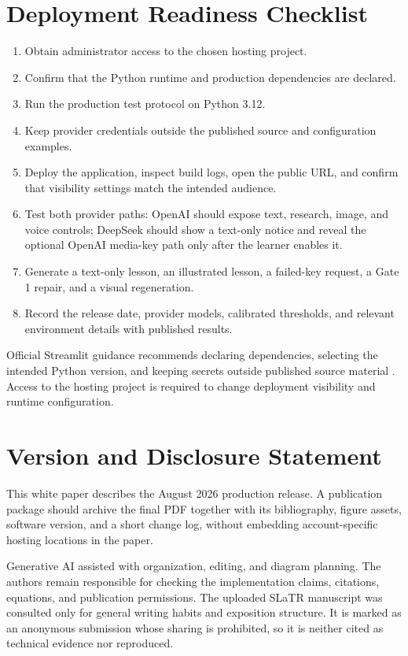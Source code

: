 \documentclass[11pt]{article}
\theoremstyle{plain}
\theoremstyle{definition}
\begin{document}
\section{Deployment Readiness Checklist}

\begin{enumerate}
  \item Obtain administrator access to the chosen hosting project.
  \item Confirm that the Python runtime and production dependencies are declared.
  \item Run the production test protocol on Python 3.12.
  \item Keep provider credentials outside the published source and configuration examples.
  \item Deploy the application, inspect build logs, open the public URL, and confirm that visibility settings match the intended audience.
  \item Test both provider paths: OpenAI should expose text, research, image, and voice controls; DeepSeek should show a text-only notice and reveal the optional OpenAI media-key path only after the learner enables it.
  \item Generate a text-only lesson, an illustrated lesson, a failed-key request, a Gate 1 repair, and a visual regeneration.
  \item Record the release date, provider models, calibrated thresholds, and relevant environment details with published results.
\end{enumerate}

Official Streamlit guidance recommends declaring dependencies, selecting the intended Python version, and keeping secrets outside published source material \citep{streamlitDeploy,streamlitSecrets}. Access to the hosting project is required to change deployment visibility and runtime configuration.

\section{Version and Disclosure Statement}

This white paper describes the August 2026 production release. A publication package should archive the final PDF together with its bibliography, figure assets, software version, and a short change log, without embedding account-specific hosting locations in the paper.

Generative AI assisted with organization, editing, and diagram planning. The authors remain responsible for checking the implementation claims, citations, equations, and publication permissions. The uploaded SLaTR manuscript was consulted only for general writing habits and exposition structure. It is marked as an anonymous submission whose sharing is prohibited, so it is neither cited as technical evidence nor reproduced.


\end{document}
